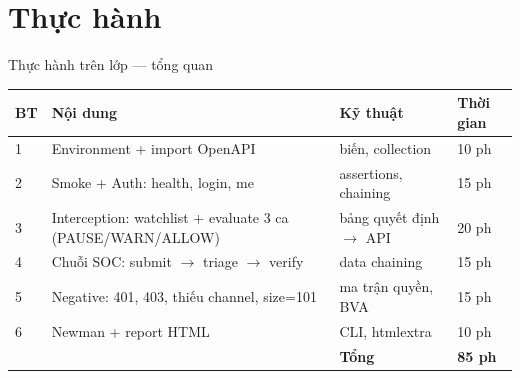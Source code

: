 \documentclass[aspectratio=169,12pt]{beamer}
\begin{document}
\section{Thực hành}

\begin{frame}{Thực hành trên lớp --- tổng quan}
  \begin{center}
  \small
  \setlength{\tabcolsep}{4pt}
  \begin{tabular}{p{0.7cm}p{5.6cm}p{3.3cm}p{1.5cm}}
    \toprule
    \textbf{BT} & \textbf{Nội dung} & \textbf{Kỹ thuật} & \textbf{Thời gian} \\
    \midrule
    1 & Environment + import OpenAPI & biến, collection & 10 ph \\
    2 & Smoke + Auth: health, login, me & assertions, chaining & 15 ph \\
    3 & Interception: watchlist + evaluate 3 ca (PAUSE/WARN/ALLOW) & bảng quyết định $\to$ API & 20 ph \\
    4 & Chuỗi SOC: submit $\to$ triage $\to$ verify & data chaining & 15 ph \\
    5 & Negative: 401, 403, thiếu channel, size=101 & ma trận quyền, BVA & 15 ph \\
    6 & Newman + report HTML & CLI, htmlextra & 10 ph \\
    \midrule
    & & \textbf{Tổng} & \textbf{85 ph} \\
    \bottomrule
  \end{tabular}
  \end{center}
\end{frame}
\end{document}
